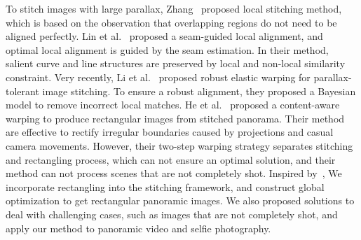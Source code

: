 \documentclass[10pt,journal,compsoc]{IEEEtran}
\begin{document}
To stitch images with large parallax, Zhang~\cite{conf/cvpr/ZhangL14a} proposed local stitching method, which is based on the observation that overlapping regions do not need to be aligned perfectly.
Lin et al.~\cite{conf/eccv/LinJCDL16} proposed a seam-guided local alignment, and optimal local alignment is guided by the seam estimation.
In their method, salient curve and line structures are preserved by local and non-local similarity constraint.
Very recently, Li et al.~\cite{journals/tmm/LiWLZZ18} proposed robust elastic warping for parallax-tolerant image stitching. To ensure a robust alignment, they proposed a Bayesian model to remove incorrect local matches.
He et al.~\cite{journals/tog/HeC013} proposed a content-aware warping to produce rectangular images from stitched panorama.  Their method are effective to rectify irregular boundaries caused by projections and casual camera movements. However, their two-step warping strategy separates stitching and rectangling process, which can not ensure an optimal solution, and their method can not process scenes that are not completely shot.
Inspired by~\cite{journals/tog/HeC013}, We incorporate rectangling into the stitching framework, and construct global optimization to get rectangular panoramic images.
We also proposed solutions to deal with challenging cases, such as images that are not completely shot, and apply our method to panoramic video and selfie photography.
\end{document}
